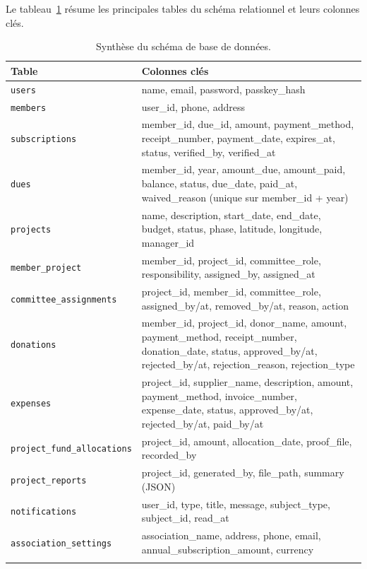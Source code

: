 Le tableau~\ref{tab:schema} résume les principales tables du schéma
relationnel et leurs colonnes clés.

\begin{center}
\begin{longtable}{@{}p{3.3cm}p{10.8cm}@{}}
\toprule
\textbf{Table} & \textbf{Colonnes clés} \\
\midrule
\endhead
\texttt{users} & name, email, password, passkey\_hash \\
\texttt{members} & user\_id, phone, address \\
\texttt{subscriptions} & member\_id, due\_id, amount, payment\_method, receipt\_number, payment\_date, expires\_at, status, verified\_by, verified\_at \\
\texttt{dues} & member\_id, year, amount\_due, amount\_paid, balance, status, due\_date, paid\_at, waived\_reason (unique sur member\_id + year) \\
\texttt{projects} & name, description, start\_date, end\_date, budget, status, phase, latitude, longitude, manager\_id \\
\texttt{member\_project} & member\_id, project\_id, committee\_role, responsibility, assigned\_by, assigned\_at \\
\texttt{committee\_assignments} & project\_id, member\_id, committee\_role, assigned\_by/at, removed\_by/at, reason, action \\
\texttt{donations} & member\_id, project\_id, donor\_name, amount, payment\_method, receipt\_number, donation\_date, status, approved\_by/at, rejected\_by/at, rejection\_reason, rejection\_type \\
\texttt{expenses} & project\_id, supplier\_name, description, amount, payment\_method, invoice\_number, expense\_date, status, approved\_by/at, rejected\_by/at, paid\_by/at \\
\texttt{project\_fund\_allocations} & project\_id, amount, allocation\_date, proof\_file, recorded\_by \\
\texttt{project\_reports} & project\_id, generated\_by, file\_path, summary (JSON) \\
\texttt{notifications} & user\_id, type, title, message, subject\_type, subject\_id, read\_at \\
\texttt{association\_settings} & association\_name, address, phone, email, annual\_subscription\_amount, currency \\
\bottomrule
\caption{Synthèse du schéma de base de données.}
\label{tab:schema}
\end{longtable}
\end{center}
